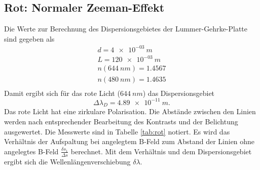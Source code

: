 \subsection{Rot: Normaler Zeeman-Effekt}
Die Werte zur Berechnung des Dispersionsgebietes der Lummer-Gehrke-Platte sind gegeben als
\begin{align*}
d         = \SI{4 e-03}{m}    \\
L         = \SI{120 e-03}{m}    \\
n(\SI{644}{nm})  = 1.4567    \\
n(\SI{480}{nm})  = 1.4635    \\
\end{align*}
Damit ergibt sich für das rote Licht ($\SI{644}{nm}$) das Dispersionsgebiet
\begin{equation*}
  \Delta \lambda_D = \SI{4.89e-11}{m}.
\end{equation*}
Das rote Licht hat eine zirkulare Polarisation.
Die Abstände zwischen den Linien werden nach entsprechender Bearbeitung des Kontrasts und der Belichtung ausgewertet.
Die Messwerte sind in Tabelle \ref{tab:rot} notiert.
Es wird das Verhältnis der Aufspaltung bei angelegtem B-Feld zum Abstand der Linien ohne angelegtes B-Feld $\frac{\delta s_{1}}{\Delta s}$ berechnet.
Mit dem Verhältnis und dem Dispersionsgebiet ergibt sich die Wellenlängenverschiebung $\delta \lambda$.
%
%
